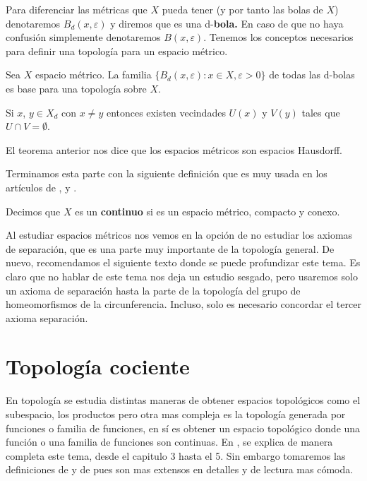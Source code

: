 Para diferenciar las métricas que $X$ pueda tener (y por tanto las bolas de $X$) denotaremos $B_{d}(x,\varepsilon)$ y diremos que es una d-\textbf{bola.} En caso de que no haya confusión simplemente denotaremos $B(x,\varepsilon)$. Tenemos los conceptos necesarios para definir una topología para un espacio métrico.

\begin{pr}\label{prp:bolas-bse}
Sea $X$ espacio métrico. La familia $\lbrace B_{d}(x,\varepsilon): x \in X, \varepsilon > 0\rbrace$ de todas las d-bolas es base para una topología sobre $X$.
\end{pr}


\begin{te}
Si $x$, $y \in X_{d}$ con $ x\neq y $ entonces existen vecindades $U(x)$ y $V(y)$ tales que $U \cap V=\emptyset$.
\end{te}

\begin{ob}\label{obs:espacios-metricos-son-hausdorff}
El teorema anterior nos dice que los espacios métricos son espacios Hausdorff.
\end{ob}

Terminamos esta parte con la siguiente definición que es muy usada en los artículos de \cite{kras}, \cite{why} y \cite{moore}.

\begin{df}
Decimos que $X$ es un \textbf{continuo} si es un espacio métrico, compacto y conexo.
\end{df}

Al estudiar espacios métricos nos vemos en la opción de no estudiar los axiomas de separación, que es una parte muy importante de la topología general. De nuevo, recomendamos el siguiente texto donde se puede profundizar este tema. Es claro que no hablar de este tema nos deja un estudio sesgado, pero usaremos solo un axioma de separación hasta la parte de la topología del grupo de homeomorfismos de la circunferencia. Incluso, solo es necesario concordar el tercer axioma separación. 


\section*{Topología cociente}

En topología se estudia distintas maneras de obtener espacios topológicos como el subespacio, los productos pero otra mas compleja es la topología generada por funciones o familia de funciones, en sí es obtener un espacio topológico donde una función o una familia de funciones son continuas. En \cite{top_salicrup}, se explica de manera completa este tema, desde el capitulo 3 hasta el 5. Sin embargo tomaremos las definiciones de \cite{top_prieto} y de \cite{top_juan} pues son mas extensos en detalles y de lectura mas cómoda. 

